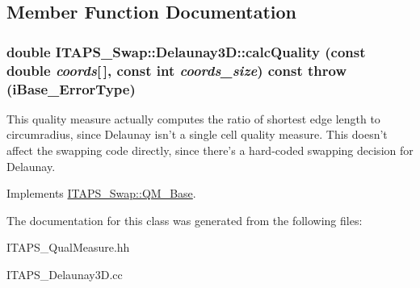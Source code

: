 \subsection{Member Function Documentation}
\hypertarget{class_i_t_a_p_s___swap_1_1_delaunay3_d_a5d045c523425ea05cdc4df77a4df61ce}{
\subsubsection[{calcQuality}]{\setlength{\rightskip}{0pt plus 5cm}double ITAPS\_\-Swap::Delaunay3D::calcQuality (const double {\em coords}\mbox{[}$\,$\mbox{]}, \/  const int {\em coords\_\-size}) const  throw (iBase\_\-ErrorType)}}
\label{class_i_t_a_p_s___swap_1_1_delaunay3_d_a5d045c523425ea05cdc4df77a4df61ce}
This quality measure actually computes the ratio of shortest edge length to circumradius, since Delaunay isn't a single cell quality measure. This doesn't affect the swapping code directly, since there's a hard-\/coded swapping decision for Delaunay. 

Implements \hyperlink{class_i_t_a_p_s___swap_1_1_q_m___base_aea047b3afc06b75a1115bbaddd8286ee}{ITAPS\_\-Swap::QM\_\-Base}.



The documentation for this class was generated from the following files:\begin{DoxyCompactItemize}
\item 
ITAPS\_\-QualMeasure.hh\item 
ITAPS\_\-Delaunay3D.cc\end{DoxyCompactItemize}
